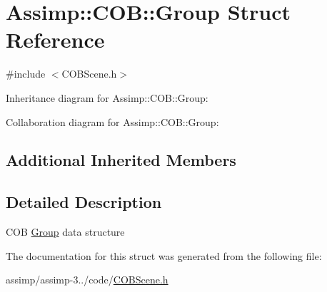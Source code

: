 \hypertarget{struct_assimp_1_1_c_o_b_1_1_group}{\section{Assimp\+:\+:C\+O\+B\+:\+:Group Struct Reference}
\label{struct_assimp_1_1_c_o_b_1_1_group}
}


{\ttfamily \#include $<$C\+O\+B\+Scene.\+h$>$}



Inheritance diagram for Assimp\+:\+:C\+O\+B\+:\+:Group\+:


Collaboration diagram for Assimp\+:\+:C\+O\+B\+:\+:Group\+:
\subsection*{Additional Inherited Members}


\subsection{Detailed Description}
C\+O\+B \hyperlink{struct_assimp_1_1_c_o_b_1_1_group}{Group} data structure 

The documentation for this struct was generated from the following file\+:\begin{DoxyCompactItemize}
\item 
assimp/assimp-\/3../code/\hyperlink{_c_o_b_scene_8h}{C\+O\+B\+Scene.\+h}\end{DoxyCompactItemize}
